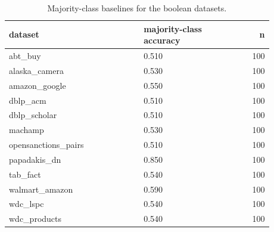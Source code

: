 \begin{table}[htbp]
\centering\scriptsize
\caption{Majority-class baselines for the boolean datasets.}
\label{tab:majority_baselines}
\setlength{\tabcolsep}{3pt}
\begin{tabular}{p{0.517\linewidth}p{0.361\linewidth}r}
\toprule
dataset & majority-class accuracy & n \\
\midrule
abt\_\allowbreak{}buy & 0.510 & 100 \\
alaska\_\allowbreak{}camera & 0.530 & 100 \\
amazon\_\allowbreak{}google & 0.550 & 100 \\
dblp\_\allowbreak{}acm & 0.510 & 100 \\
dblp\_\allowbreak{}scholar & 0.510 & 100 \\
machamp & 0.530 & 100 \\
opensanctions\_\allowbreak{}pairs & 0.510 & 100 \\
papadakis\_\allowbreak{}dn & 0.850 & 100 \\
tab\_\allowbreak{}fact & 0.540 & 100 \\
walmart\_\allowbreak{}amazon & 0.590 & 100 \\
wdc\_\allowbreak{}lspc & 0.540 & 100 \\
wdc\_\allowbreak{}products & 0.540 & 100 \\
\bottomrule
\end{tabular}
\end{table}
